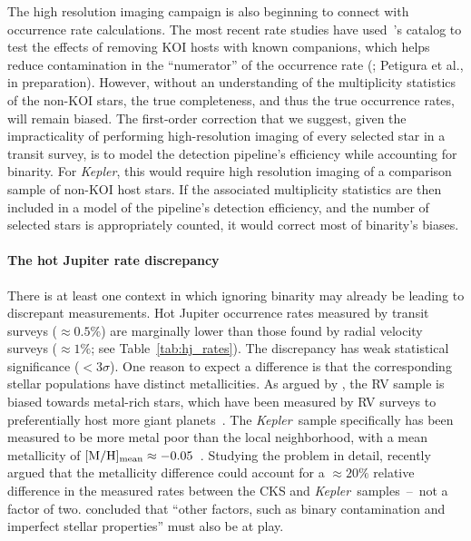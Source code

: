 The high resolution imaging campaign is also beginning to connect with
occurrence rate calculations.
The most recent rate studies have used~\citet{furlan_kepler_2017}'s 
catalog to test the effects of removing KOI hosts with known companions, which 
helps reduce contamination in the ``numerator'' of 
the occurrence rate (\citealt{fulton_california-_2017}; Petigura et al.,
in preparation).
However, without an understanding of the multiplicity statistics of the 
non-KOI stars, the true completeness, and thus the true 
occurrence rates, will remain biased.
The first-order correction that we suggest, given the impracticality of 
performing high-resolution imaging of every selected star in a transit survey,
is to model the detection pipeline's efficiency while accounting for 
binarity.
For {\it Kepler}, this would require high resolution imaging of a
comparison sample of non-KOI host stars. If the associated multiplicity 
statistics are then included in a model of the pipeline's detection 
efficiency, and the number of selected stars is appropriately counted, it 
would correct most of binarity's biases.


\paragraph{The hot Jupiter rate discrepancy}
There is at least one context in which ignoring binarity may already be 
leading to discrepant measurements.
Hot Jupiter occurrence rates measured by transit surveys ($\approx 0.5\%$) are 
marginally lower than those found by radial velocity surveys ($\approx 1\%$; 
see Table~\ref{tab:hj_rates}).
The discrepancy has weak statistical significance ($<3\sigma$).
One reason to expect a difference is that the corresponding stellar 
populations have distinct metallicities.
As argued by \citet{gould_frequency_2006}, the RV sample is biased towards 
metal-rich stars, which have been measured by RV surveys to preferentially 
host more giant 
planets~\citep{santos_spectroscopic_2004,fischer_planet-metallicity_2005}.
The {\it Kepler}\ sample specifically has been measured to be more metal poor 
than the local neighborhood, with a mean metallicity of $[{\rm M/H}]_{\rm 
    mean}\approx -0.05$~\citep{dong_metallicities_2014,guo_metallicity_2017}.
Studying the problem in detail, \citeauthor{guo_metallicity_2017}\! recently 
argued that the metallicity difference could account for a $\approx 20\%$ 
relative difference in the measured rates between the CKS and {\it Kepler}\ 
samples~--~not a factor of two.
\citeauthor{guo_metallicity_2017}\! concluded that ``other factors, such as 
binary contamination and imperfect stellar properties'' must also be at play.

